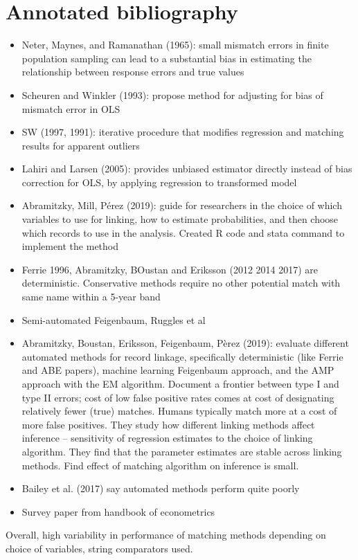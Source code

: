 \documentclass[12pt]{article}
\begin{document}
\section{Annotated bibliography}
\begin{itemize}
\item Neter, Maynes, and Ramanathan (1965): small mismatch errors in finite population sampling can lead to a substantial bias in estimating the relationship between response errors and true values
\item Scheuren and Winkler (1993): propose method for adjusting for bias of mismatch error in OLS
\item SW (1997, 1991): iterative procedure that modifies regression and matching results for apparent outliers 
\item Lahiri and Larsen (2005):   provides unbiased estimator directly instead of bias correction for OLS, by applying regression to transformed model 
\item Abramitzky, Mill, P\'erez (2019): guide for researchers in the choice of which variables to use for linking, how to estimate probabilities, and then choose which records to use in the analysis.  Created R code and stata command to implement the method
\item Ferrie 1996, Abramitzky, BOustan and Eriksson (2012 2014 2017) are deterministic.  Conservative methods require no other potential match with same name within a 5-year band
\item Semi-automated Feigenbaum, Ruggles et al 
\item Abramitzky, Boustan, Eriksson, Feigenbaum, P\`erez (2019): evaluate different automated methods for record linkage, specifically deterministic (like Ferrie and ABE papers), machine learning Feigenbaum approach, and the AMP approach with the EM algorithm.  Document a frontier between type I and type II errors; cost of low false positive rates comes at cost of designating relatively fewer (true) matches.  Humans typically match more at a cost of more false positives.  They study how different linking methods affect inference -- sensitivity of regression estimates to the choice of linking algorithm.  They find that the parameter estimates are stable across linking methods.  Find effect of matching algorithm on inference is small. 
\item Bailey et al. (2017) say automated methods perform quite poorly
\item Survey paper from handbook of econometrics
\end{itemize}

Overall, high variability in performance of matching methods depending on choice of variables, string comparators used. 

 

\end{document}
